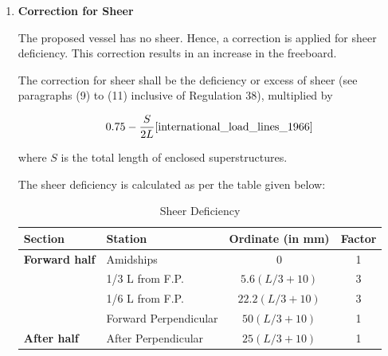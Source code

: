 \documentclass[12pt,a4paper,twoside]{report}
\begin{document}
\begin{enumerate}[\alph*)]
Therefore, the correction in freeboard is

\[
\begin{aligned}
\text{Correction}
&= -0.40886 \times 1609\\
&= -657.862~\mathrm{mm}.
\end{aligned}
\]

\item \textbf{Correction for Sheer}

The proposed vessel has no sheer. Hence, a correction is applied for
sheer deficiency. This correction results in an increase in the
freeboard.

The correction for sheer shall be the deficiency or excess of sheer
(see paragraphs (9) to (11) inclusive of Regulation 38), multiplied
by

\begin{equation}
0.75-\frac{S}{2L} \cite{international_load_lines_1966}
\label{eq : 2.30}
\end{equation}

where $S$ is the total length of enclosed superstructures.

The sheer deficiency is calculated as per the table given below:
\begin{table}[H]
    \centering
    \caption{Sheer Deficiency}
    \label{tab:sheer_deficiency}

    \scriptsize
    \setlength{\tabcolsep}{6pt}
    \renewcommand{\arraystretch}{1.15}

    \begin{tabular}{l l c c}
        \toprule
        \textbf{Section} &
        \textbf{Station} &
        \textbf{Ordinate (in mm)} &
        \textbf{Factor} \\
        \midrule

        \textbf{Forward half}
        & Amidships
        & 0
        & 1 \\

        & 1/3 L from F.P.
        & $5.6(L/3+10)$
        & 3 \\

        & 1/6 L from F.P.
        & $22.2(L/3+10)$
        & 3 \\

        & Forward Perpendicular
        & $50(L/3+10)$
        & 1 \\

        \midrule

        \textbf{After half}
        & After Perpendicular
        & $25(L/3+10)$
        & 1 \\


\end{tabular}
\end{table}
\end{enumerate}
\end{document}
